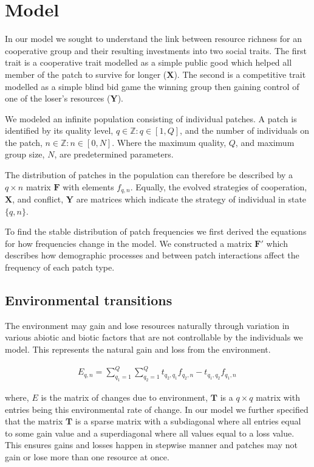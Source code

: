 \section{Model}

In our model we sought to understand the link between resource richness for an cooperative group and their resulting investments into two social traits. The first trait is a cooperative trait modelled as a simple public good which helped all member of the patch to survive for longer ($\mathbf{X}$). The second is a competitive trait modelled as a simple blind bid game the winning group then gaining control of one of the loser's resources ($\mathbf{Y}$). 

We modeled an infinite population consisting of individual patches. A patch is identified by its quality level, $q \in \mathbb{Z} : q \in \left[ 1, Q \right]$, and the number of individuals on the patch, $n \in \mathbb{Z} : n \in \left[ 0, N \right]$. Where the maximum quality, $Q$, and maximum group size, $N$, are predetermined parameters. 

The distribution of patches in the population can therefore be described by a $q \times n$ matrix $\mathbf{F}$ with elements $f_{q,n}$. Equally, the evolved strategies of cooperation, $\mathbf{X}$, and conflict, $\mathbf{Y}$ are matrices which indicate the strategy of individual in state $\{q, n\}$. 

To find the stable distribution of patch frequencies we first derived the equations for how frequencies change in the model. We constructed a matrix $\mathbf{F}'$ which describes how demographic processes and between patch interactions affect the frequency of each patch type.

\subsection{Environmental transitions}
The environment may gain and lose resources naturally through variation in various abiotic and biotic factors that are not controllable by the individuals we model. This represents the natural gain and loss from the environment.

\begin{align}
    E_{q,n} = \sum^Q_{q_1=1} \sum^Q_{q_2=1}  t_{q_2, q_1} f_{q_2, n} - t_{q_1, q_2} f_{q_1, n} \,
\end{align}

where, $E$ is the matrix of changes due to environment, $\mathbf{T}$ is a $q \times q$ matrix with entries being this environmental rate of change. In our model we further specified that the matrix $\mathbf{T}$ is a sparse matrix with a subdiagonal where all entries equal to some gain value and a superdiagonal where all values equal to a loss value. This ensures gains and losses happen in stepwise manner and patches may not gain or lose more than one resource at once.

